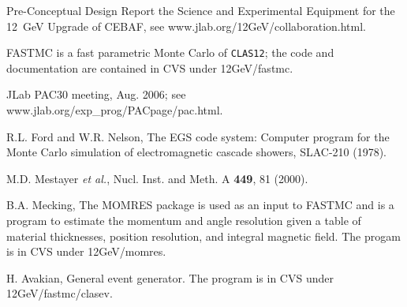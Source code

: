 \begin{thebibliography}{99}

Pre-Conceptual Design Report the Science and Experimental Equipment
for the 12~GeV Upgrade of CEBAF, see www.jlab.org/12GeV/collaboration.html.

FASTMC is a fast parametric Monte Carlo of {\tt CLAS12}; the code and 
documentation are contained in CVS under 12GeV/fastmc.

JLab PAC30 meeting, Aug. 2006; see www.jlab.org/exp\_prog/PACpage/pac.html.

R.L. Ford and W.R. Nelson, The EGS code system: Computer program for the 
Monte Carlo simulation of electromagnetic cascade showers, SLAC-210 (1978).
 
M.D. Mestayer {\it et al.}, Nucl. Inst. and Meth. A {\bf 449}, 81 (2000).

B.A. Mecking, The MOMRES package is used as an input to FASTMC and is
a program to estimate the momentum and angle resolution given a table of 
material thicknesses, position resolution, and integral magnetic field.
The progam is in CVS under 12GeV/momres.

H. Avakian, General event generator.  The program is in CVS under
12GeV/fastmc/clasev.

\end{thebibliography}



